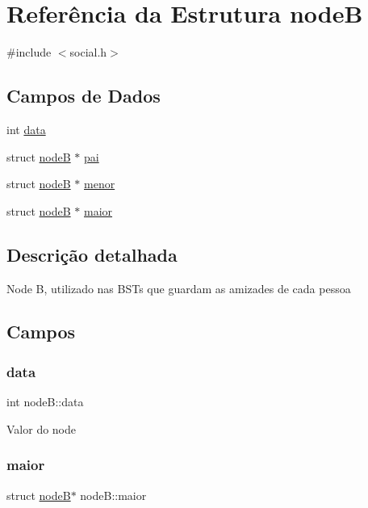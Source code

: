 \hypertarget{structnodeB}{}\section{Referência da Estrutura nodeB}
\label{structnodeB}


{\ttfamily \#include $<$social.\+h$>$}

\subsection*{Campos de Dados}
\begin{DoxyCompactItemize}
\item 
int \mbox{\hyperlink{structnodeB_a77629c0a64c8d9c973500956426a3839}{data}}
\item 
struct \mbox{\hyperlink{structnodeB}{nodeB}} $\ast$ \mbox{\hyperlink{structnodeB_a8b1942214da0ec30a911d3d8f1b2f142}{pai}}
\item 
struct \mbox{\hyperlink{structnodeB}{nodeB}} $\ast$ \mbox{\hyperlink{structnodeB_a433b5c01c13cba63ca218f887ce3fef7}{menor}}
\item 
struct \mbox{\hyperlink{structnodeB}{nodeB}} $\ast$ \mbox{\hyperlink{structnodeB_a8c430943b45eba8b8ddb4007b0ed4d2c}{maior}}
\end{DoxyCompactItemize}


\subsection{Descrição detalhada}
Node B, utilizado nas B\+S\+Ts que guardam as amizades de cada pessoa 

\subsection{Campos}
\mbox{\label{structnodeB_a77629c0a64c8d9c973500956426a3839}} 
\subsubsection{\texorpdfstring{data}{data}}
{\footnotesize\ttfamily int node\+B\+::data}

Valor do node \mbox{\label{structnodeB_a8c430943b45eba8b8ddb4007b0ed4d2c}} 
\subsubsection{\texorpdfstring{maior}{maior}}
{\footnotesize\ttfamily struct \mbox{\hyperlink{structnodeB}{nodeB}}$\ast$ node\+B\+::maior}

